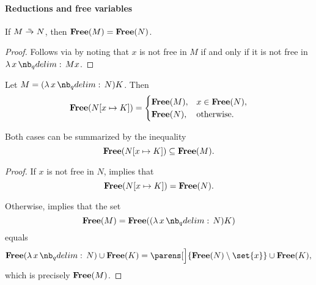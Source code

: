 \paragraph{Reductions and free variables}

\begin{proposition}\label{thm:eta_reduction_free_variables}
  If \( M \ered N \), then \( \op*{Free}(M) = \op*{Free}(N) \).
\end{proposition}
\begin{proof}
  Follows via  by noting that \( x \) is not free in \( M \) if and only if it is not free in \( \qabs x M x \).
\end{proof}

\begin{lemma}\label{thm:beta_contractum_free_variables}
  Let \( M = (\qabs x N) K \). Then
  \begin{equation}\label{eq:thm:beta_contractum_free_variables/equality}
    \op*{Free}(N[x \mapsto K]) = \begin{cases}
      \op*{Free}(M), &x \in \op*{Free}(N), \\
      \op*{Free}(N), &\T{otherwise.} \\
    \end{cases}
  \end{equation}

  Both cases can be summarized by the inequality
  \begin{equation}\label{eq:thm:beta_contractum_free_variables/inequality}
    \op*{Free}(N[x \mapsto K]) \subseteq \op*{Free}(M).
  \end{equation}
\end{lemma}
\begin{proof}
  If \( x \) is not free in \( N \),  implies that
  \begin{equation*}
    \op*{Free}(N[x \mapsto K]) = \op*{Free}(N).
  \end{equation*}

  Otherwise,  implies that the set
  \begin{equation*}
    \op*{Free}(M)
    =
    \op*{Free}((\qabs x N) K)
  \end{equation*}
  equals
  \begin{equation*}
    \op*{Free}(\qabs x N) \cup \op*{Free}(K)
    =
    \parens[\Big]{ \op*{Free}(N) \setminus \set{ x } } \cup \op*{Free}(K),
  \end{equation*}
  which is precisely \( \op*{Free}(M) \).
\end{proof}

